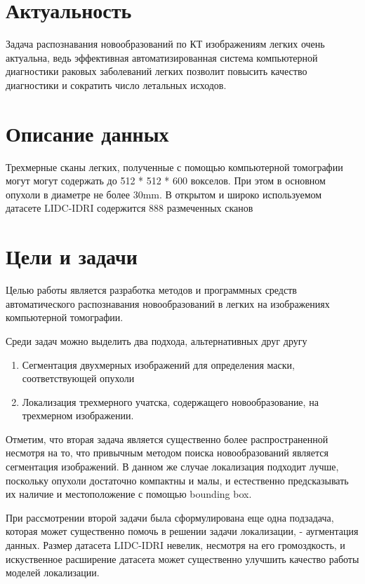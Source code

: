 
\section{Актуальность}

Задача распознавания новообразований по КТ изображениям легких очень актуальна, ведь эффективная автоматизированная система компьютерной диагностики раковых заболеваний легких позволит повысить качество диагностики и сократить число летальных исходов.

\section{Описание данных}

Трехмерные сканы легких, полученные с помощью компьютерной томографии могут могут содержать до 512 * 512 * 600 вокселов. При этом в основном опухоли в диаметре не более 30mm. В открытом и широко используемом датасете LIDC-IDRI содержится 888 размеченных сканов

\section{Цели и задачи}

Целью работы является разработка методов и программных средств автоматического распознавания новообразований в легких на изображениях компьютерной томографии. 

Среди задач можно выделить два подхода, альтернативных друг другу

\begin{enumerate}
    \item Сегментация двухмерных изображений для определения маски, соответствующей опухоли
    \item Локализация трехмерного учатска, содержащего новообразование, на трехмерном изображении.
\end{enumerate}

Отметим, что вторая задача является существенно более распространенной несмотря на то, что
привычным методом поиска новообразований является сегментация изображений. В данном же случае локализация подходит лучше, поскольку опухоли достаточно компактны и малы, и естественно предсказывать их наличие и местоположение с помощью bounding box.

При рассмотрении второй задачи была сформулирована еще одна подзадача, которая может существенно помочь в решении задачи локализации, - аугментация данных. Размер датасета LIDC-IDRI невелик, несмотря на его громоздкость, и искуственное расширение датасета может существенно улучшить качество работы моделей локализации.
